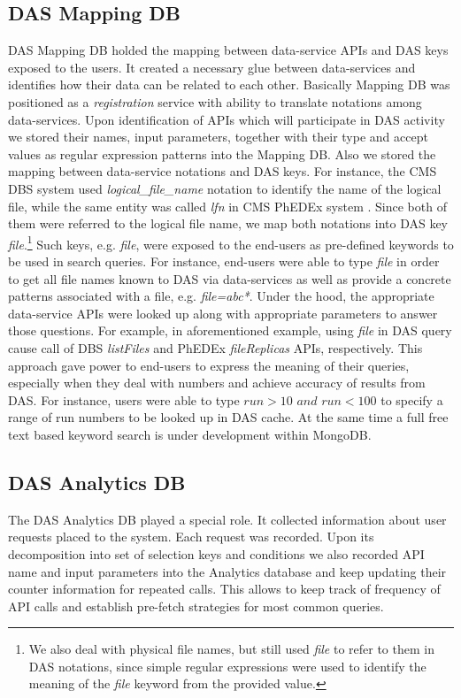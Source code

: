 \documentclass[a4paper]{jpconf}
\begin{document}
\subsection{DAS Mapping DB}
DAS Mapping DB holded the mapping between data-service APIs and DAS keys exposed to
the users. It created a necessary glue between data-services and identifies
how their data can be related to each other. Basically Mapping DB was positioned 
as a {\it registration} service with ability to translate notations among data-services.
Upon identification of APIs which will participate in DAS activity 
we stored their names, input parameters, together with their type and accept 
values as regular expression patterns into the Mapping DB. 
Also we stored the mapping between data-service notations and DAS keys. 
For instance, the CMS DBS system \cite{DBS}
used {\it logical\_file\_name} notation to identify the name of the
logical file, while the same entity was called {\it lfn} in CMS PhEDEx system \cite{PhEDEx}.
Since both of them were referred to the logical file name, 
we map both notations into DAS key {\it file}.\footnote{We
also deal with physical file names, but still used {\it file} to refer to them in
DAS notations, since simple regular expressions were used to identify the
meaning of the {\it file} keyword from the provided value.}
Such keys, e.g. {\it file}, were exposed to the end-users as pre-defined keywords to
be used in search queries. For instance, end-users were able to type {\it file} in
order to get all file names known to DAS via data-services as well as
provide a concrete patterns associated with a file, e.g. {\it file=abc*}.
Under the hood, the appropriate data-service APIs were looked up along with appropriate
parameters to answer those questions. For example,
in aforementioned example, using {\it file} in DAS query cause call of DBS 
{\it listFiles} and PhEDEx {\it fileReplicas} APIs, respectively.
This approach gave power to end-users to express the meaning of their queries, especially
when they deal with numbers and achieve accuracy of results from DAS. 
For instance, users were able to type $run>10\,\,and\,\, run < 100$
to specify a range of run numbers to be looked up in DAS cache. At the same time
a full free text based keyword search is under development within MongoDB.

\subsection{DAS Analytics DB}
The DAS Analytics DB played a special role. It collected information
about user requests placed to the system. Each request was recorded. Upon its
decomposition into set of selection keys and conditions we also recorded
API name and input parameters into the Analytics database and 
keep updating their counter information for repeated calls. 
This allows to keep track of frequency of API calls and establish 
pre-fetch strategies for most common queries.
\end{document}
